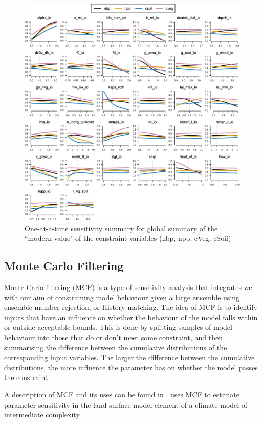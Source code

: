 \documentclass[gmd, manuscript]{copernicus}
\begin{document}
\begin{figure}[t]
\includegraphics[width=12cm]{./graphics/Y_oaat_const_level1a_wave01_scaled_norm}
\caption{One-at-a-time sensitivity summary for global summary of the ``modern value" of the constraint variables (nbp, npp, cVeg, cSoil)}
\label{fig:Y_oaat_const_level1a_wave01_scaled_norm}
\end{figure}


\subsection{Monte Carlo Filtering}\label{ssec:sa_MCF}

Monte Carlo filtering (MCF) is a type of sensitivity analysis that integrates well with our aim of constraining model behaviour given a large ensemble using ensemble member rejection, or History matching. The idea of MCF is to identify inputs that have an influence on whether the behaviour of the model falls within or outside acceptable bounds. This is done by splitting samples of model behaviour into those that do or don't meet some constraint, and then summarising the difference between the cumulative distributions of the corresponding input variables. The larger the difference between the cumulative distributions, the more influence the parameter has on whether the model passes the constraint.

A description of MCF and its uses can be found in \cite{pianosi2016sensitivity}. \cite{mcneall2020correcting} uses MCF to estimate parameter sensitivity in the land surface model element of a climate model of intermediate complexity.
\end{document}
